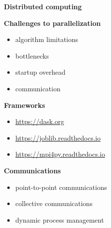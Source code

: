 \begin{frame}\begin{center}
		\LARGE\textbf{Distributed computing}
\end{center}\end{frame}
\begin{frame}\textbf{Challenges to parallelization}\vspace{0.3cm}

\begin{itemize}\setlength\itemsep{1em}
  \item algorithm limitations
  \item bottlenecks
  \item startup overhead
	\item communication
\end{itemize}

\end{frame}
\begin{frame}\textbf{Frameworks}\vspace{0.3cm}
	\begin{itemize}\setlength\itemsep{1em}
	    \item \url{https://dask.org}
	    \item \url{https://joblib.readthedocs.io}
			\item \url{https://mpi4py.readthedocs.io}
	\end{itemize}
\end{frame}
\begin{frame}\textbf{Communications}\vspace{0.3cm}

\begin{itemize}\setlength\itemsep{1em}
  \item point-to-point communications
  \item collective communications
  \item dynamic process management
\end{itemize}

\end{frame}
